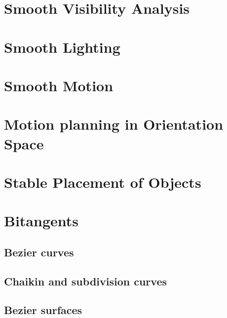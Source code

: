 \documentclass[11pt]{article}
\begin{document}
\clearpage


\section{Smooth Visibility Analysis}


\section{Smooth Lighting}

\section{Smooth Motion}

\section{Motion planning in Orientation Space}

\section{Stable Placement of Objects}


\section{Bitangents}
\subsection{Bezier curves}


\subsection{Chaikin and subdivision curves}

\subsection{Bezier surfaces}
\end{document}
